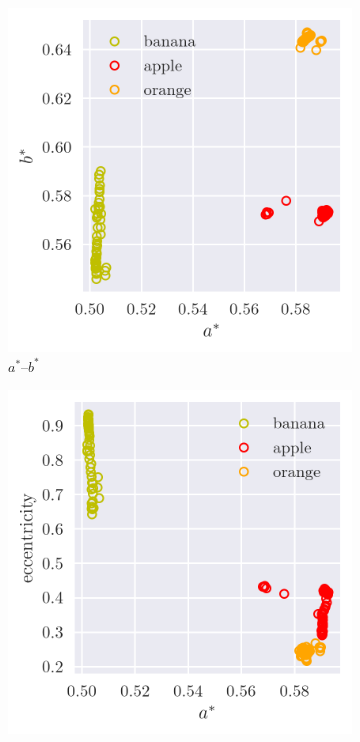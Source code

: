 \documentclass[12pt,a4paper]{article}
\begin{document}
\begin{figure}[htb]
	\centering
	\begin{subfigure}[h!]{0.3\textwidth}
		\centering
		\includegraphics[width=\textwidth]{ab_space.png}
		\caption{$a^*$--$b^*$}
		\label{fig:ab-space}
	\end{subfigure}
	\begin{subfigure}[h!]{0.3\textwidth}
		\centering
		\includegraphics[width=\textwidth]{ae_space.png}

\end{subfigure}
\end{figure}
\end{document}
